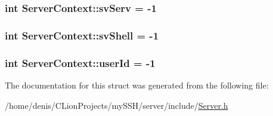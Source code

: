 \subsubsection[{\texorpdfstring{sv\+Serv}{svServ}}]{\setlength{\rightskip}{0pt plus 5cm}int Server\+Context\+::sv\+Serv = -\/1}\hypertarget{structServerContext_a728b751fab25a3042eb9e6b668bc9fb3}{}\label{structServerContext_a728b751fab25a3042eb9e6b668bc9fb3}
\subsubsection[{\texorpdfstring{sv\+Shell}{svShell}}]{\setlength{\rightskip}{0pt plus 5cm}int Server\+Context\+::sv\+Shell = -\/1}\hypertarget{structServerContext_a2d08d74a2daaedabbcce115bdf8f05fa}{}\label{structServerContext_a2d08d74a2daaedabbcce115bdf8f05fa}
\subsubsection[{\texorpdfstring{user\+Id}{userId}}]{\setlength{\rightskip}{0pt plus 5cm}int Server\+Context\+::user\+Id = -\/1}\hypertarget{structServerContext_a3896143ad0272c9faa55b5278e48ddef}{}\label{structServerContext_a3896143ad0272c9faa55b5278e48ddef}


The documentation for this struct was generated from the following file\+:\begin{DoxyCompactItemize}
\item 
/home/denis/\+C\+Lion\+Projects/my\+S\+S\+H/server/include/\hyperlink{Server_8h}{Server.\+h}\end{DoxyCompactItemize}

